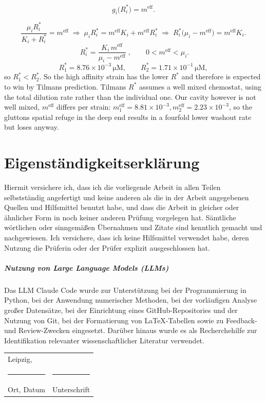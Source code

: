 \documentclass[11pt,a4paper]{report}
\begin{document}
\begin{equation}
	g_i\bigl(R^{*}_i\bigr)=m^{\mathrm{eff}}.
	\label{eq:breakeven}
\end{equation}

\begin{equation}
	\frac{\mu_iR^{*}_i}{K_i+R^{*}_i}=m^{\mathrm{eff}}
	\;\Longrightarrow\;
	\mu_iR^{*}_i=m^{\mathrm{eff}}K_i+m^{\mathrm{eff}}R^{*}_i
	\;\Longrightarrow\;
	R^{*}_i\bigl(\mu_i-m^{\mathrm{eff}}\bigr)=m^{\mathrm{eff}}K_i .
	\label{eq:rstar_steps}
\end{equation}
\begin{equation}
	{\;R^{*}_i=\frac{K_i\,m^{\mathrm{eff}}}{\mu_i-m^{\mathrm{eff}}}\;},
	\qquad 0<m^{\mathrm{eff}}<\mu_i .
	\label{eq:rstar_monod}
\end{equation}
\begin{equation}
	R^{*}_1=8.76\times10^{-3}\,\mathrm{\mu M},
	\qquad
	R^{*}_2=1.71\times10^{-1}\,\mathrm{\mu M},
	\label{eq:rstar_cavity}
\end{equation}
so $R^{*}_1<R^{*}_2$. So the high affinity strain has the lower $R^*$ and therefore is expected to win by Tilmans prediction. Tilmans $R^*$ assumes a well mixed chemostat, using the total dilution rate rather than the individual one. Our cavity however is not well mixed, $m^{\mathrm{eff}}$ differs per strain: $m_1^{\mathrm{eff}} = 8.81 \times 10^{-3}, m_2^{\mathrm{eff}} = 2.23 \times 10^{-3}$, so the gluttons spatial refuge in the deep end results in a fourfold lower washout rate but loses anyway.

\chapter*{Eigenständigkeitserklärung}
Hiermit versichere ich, dass ich die vorliegende Arbeit in allen Teilen selbstständig angefertigt
und keine anderen als die in der Arbeit angegebenen Quellen und Hilfsmittel benutzt habe, und
dass die Arbeit in gleicher oder ähnlicher Form in noch keiner anderen Prüfung vorgelegen hat. Sämtliche wörtlichen oder sinngemäßen Übernahmen und Zitate sind kenntlich gemacht und nachgewiesen. Ich versichere, dass ich keine Hilfsmittel verwendet habe, deren Nutzung die Prüferin oder der Prüfer explizit ausgeschlossen hat.
\paragraph{Nutzung von Large Language Models (LLMs)}
Das LLM Claude Code wurde zur Unterstützung bei der Programmierung in Python, bei der Anwendung numerischer Methoden, bei der vorläufigen Analyse großer Datensätze, bei der Einrichtung eines GitHub-Repositories und der Nutzung von Git, bei der Formatierung von LaTeX-Tabellen sowie zu Feedback- und Review-Zwecken eingesetzt. Darüber hinaus wurde es als Recherchehilfe zur Identifikation relevanter wissenschaftlicher Literatur verwendet.


\vspace{2cm}

\noindent
\begin{tabular}{p{7cm}p{7cm}}
	Leipzig,  & \\
	\rule{6cm}{0.4pt} & \rule{6cm}{0.4pt} \\
	Ort, Datum & Unterschrift
\end{tabular}
\end{document}

